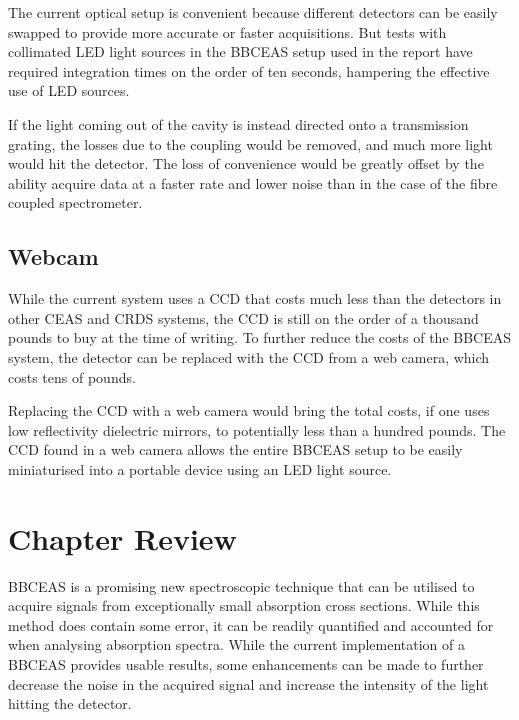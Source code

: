 The current optical setup is convenient because different detectors can be
easily swapped to provide more accurate or faster acquisitions. But tests with
collimated \ac{LED} light sources in the \ac{BBCEAS} setup used in the report
have required integration times on the order of ten seconds, hampering the
effective use of \ac{LED} sources.

If the light coming out of the cavity is instead directed onto a transmission
grating, the losses due to the coupling would be removed, and much more light
would hit the detector. The loss of convenience would be greatly offset by the
ability acquire data at a faster rate and lower noise than in the case of the
fibre coupled spectrometer.



\subsection{Webcam}\label{subsec:bbceas_webcam}

While the current system uses a \ac{CCD} that costs much less than the
detectors in other \ac{CEAS} and \ac{CRDS} systems, the \ac{CCD} is still on
the order of a thousand pounds to buy at the time of writing. To further reduce
the costs of the \ac{BBCEAS} system, the detector can be replaced with the
\ac{CCD} from a web camera, which costs tens of pounds.

Replacing the \ac{CCD} with a web camera would bring the total costs, if one
uses low reflectivity dielectric mirrors, to potentially less than a hundred
pounds. The \ac{CCD} found in a web camera allows the entire \ac{BBCEAS} setup
to be easily miniaturised into a portable device using an \ac{LED} light
source.


\section*{Chapter Review}

\ac{BBCEAS} is a promising new spectroscopic technique that can be utilised to
acquire signals from exceptionally small absorption cross sections. While this
method does contain some error, it can be readily quantified and accounted
for when analysing absorption spectra. While the current implementation of a
\ac{BBCEAS} provides usable results, some enhancements can be made to further
decrease the noise in the acquired signal and increase the intensity of the
light hitting the detector.
